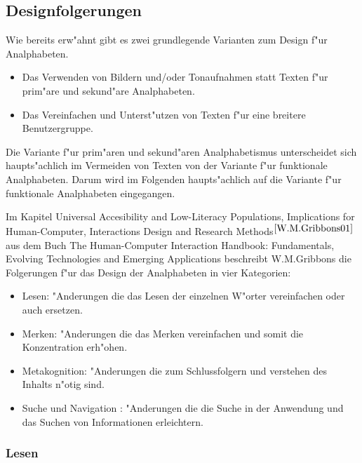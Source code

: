 \subsection{ Designfolgerungen}\label{sec:designClue}
Wie bereits erw"ahnt gibt es zwei grundlegende Varianten zum Design f"ur Analphabeten.
\begin{itemize}
\item Das Verwenden von Bildern und/oder Tonaufnahmen statt Texten f"ur prim"are und sekund"are Analphabeten.
\item Das Vereinfachen und Unterst"utzen von Texten f"ur eine breitere Benutzergruppe.
\end{itemize}
Die Variante f"ur prim"aren und sekund"aren Analphabetismus unterscheidet sich haupts"achlich im Vermeiden von Texten von der Variante f"ur funktionale Analphabeten. Darum wird im Folgenden haupts"achlich auf die Variante f"ur funktionale Analphabeten eingegangen.

Im Kapitel \glqq Universal Accesibility and Low-Literacy Populations, Implications for Human-Computer, Interactions Design and Research Methods\grqq{}$^{\ref{W.M.Gribbons01}}$ aus dem Buch \glqq The Human-Computer Interaction Handbook: Fundamentals, Evolving Technologies and Emerging Applications\grqq{} beschreibt W.M.Gribbons die Folgerungen f"ur das Design der Analphabeten in vier Kategorien:\\

\begin{itemize}
\item Lesen:              "Anderungen die das Lesen der einzelnen W"orter vereinfachen oder auch ersetzen.
\item Merken:            "Anderungen die das Merken vereinfachen und somit die Konzentration erh"ohen.
\item Metakognition: "Anderungen die zum Schlussfolgern und verstehen des Inhalts n"otig sind.
\item Suche und Navigation : "Anderungen die die Suche in der Anwendung und das Suchen von Informationen erleichtern.
\end{itemize}

\subsubsection{Lesen}\label{sec:designClueReading}

